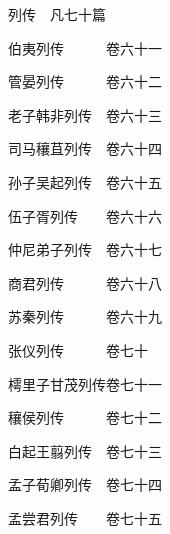 \par\hspace{3.5em}列传　凡七十篇
\par\hspace{3.5em}伯夷列传　　　\hspace{1.5em}卷六十一
\par\hspace{3.5em}管晏列传　　　\hspace{1.5em}卷六十二
\par\hspace{3.5em}老子韩非列传　\hspace{1.5em}卷六十三
\par\hspace{3.5em}司马穰苴列传　\hspace{1.5em}卷六十四
\par\hspace{3.5em}孙子吴起列传　\hspace{1.5em}卷六十五
\par\hspace{3.5em}伍子胥列传　　\hspace{1.5em}卷六十六
\par\hspace{3.5em}仲尼弟子列传　\hspace{1.5em}卷六十七
\par\hspace{3.5em}商君列传　　　\hspace{1.5em}卷六十八
\par\hspace{3.5em}苏秦列传　　　\hspace{1.5em}卷六十九
\par\hspace{3.5em}张仪列传　　　\hspace{1.5em}卷七十
\par\hspace{3.5em}樗里子甘茂列传\hspace{1.5em}卷七十一
\par\hspace{3.5em}穰侯列传　　　\hspace{1.5em}卷七十二
\par\hspace{3.5em}白起王翦列传　\hspace{1.5em}卷七十三
\par\hspace{3.5em}孟子荀卿列传　\hspace{1.5em}卷七十四
\par\hspace{3.5em}孟尝君列传　　\hspace{1.5em}卷七十五

